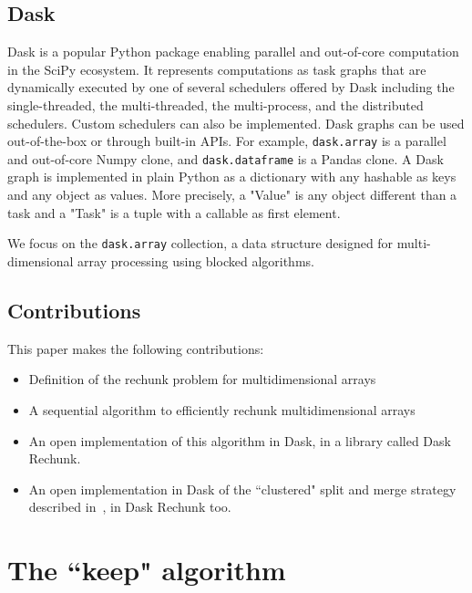 \documentclass[conference]{IEEEtran}
\begin{document}
\subsection{Dask}

Dask is a popular Python package enabling parallel and out-of-core
computation in the SciPy ecosystem. It represents computations as task
graphs that are dynamically executed by one of several schedulers offered
by Dask including the single-threaded, the multi-threaded, the
multi-process, and the distributed schedulers. Custom schedulers can also
be implemented. Dask graphs can be used out-of-the-box or through built-in
APIs. For example, \texttt{dask.array} is a parallel and out-of-core Numpy
clone, and
\texttt{dask.dataframe} is a Pandas clone. A Dask graph is implemented in
plain Python as a dictionary with any hashable as keys and any object as
values. More precisely, a "Value" is any object different than a task and a
"Task" is a tuple with a callable as first element.

We focus on the \texttt{dask.array} collection, a data structure designed for
multi-dimensional array processing using blocked algorithms.

\subsection{Contributions}
This paper makes the following contributions:
\begin{itemize}
  \item Definition of the rechunk problem for multidimensional arrays
  \item A sequential algorithm to efficiently rechunk multidimensional arrays
  \item An open implementation of this algorithm in Dask, in a library called Dask Rechunk.
  \item An open implementation in Dask of the ``clustered" split and merge strategy described in~\cite{seqalgorithms}, in Dask Rechunk too.
\end{itemize}

\section{The ``keep" algorithm}
\end{document}
